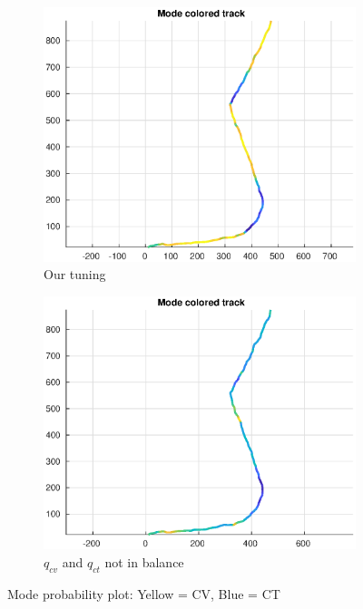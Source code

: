 \begin{figure}
    \centering
    \hspace*{-2cm}\begin{adjustbox}{minipage=\linewidth, scale=1.3}
        \begin{subfigure}{.5\textwidth}
            \includegraphics[width=\linewidth]{plots/task22_modeprob.eps} 
            \caption{Our tuning}
            \label{fig:task22_modeprob_tuned}
        \end{subfigure}
        \begin{subfigure}{.5\textwidth}
            \includegraphics[width=\linewidth]{plots/task22_modeprob_highcv.eps} 
            \caption{$q_{cv}$ and $q_{ct}$ not in balance}
            \label{fig:task22_modeprob_highcv}
        \end{subfigure}
    \end{adjustbox}
        \caption{Mode probability plot: Yellow = CV, Blue = CT}
        \label{fig:task22_modeprob}
\end{figure}

